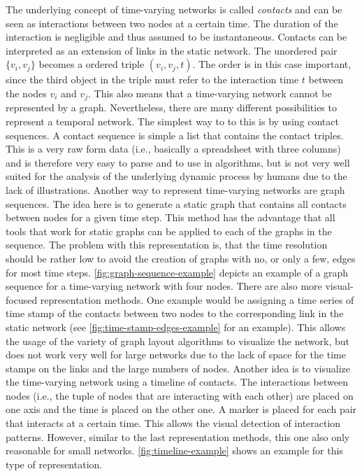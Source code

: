 The underlying concept of time-varying networks is called \emph{contacts} and can be seen as interactions between two nodes at a certain time.
The duration of the interaction is negligible and thus assumed to be instantaneous.
Contacts can be interpreted as an extension of links in the static network.
The unordered pair \(\{v_{i}, v_{j}\}\) becomes a ordered triple \((v_{i}, v_{j}, t)\).
The order is in this case important, since the third object in the triple must refer to the interaction time \(t\) between the nodes \(v_{i}\) and \(v_{j}\).
This also means that a time-varying network cannot be represented by a graph.
Nevertheless, there are many different possibilities to represent a temporal network.
The simplest way to to this is by using contact sequences.
A contact sequence is simple a list that contains the contact triples.
This is a very raw form data (i.e., basically a spreadsheet with three columns) and is therefore very easy to parse and to use in algorithms, but is not very well suited for the analysis of the underlying dynamic process by humans due to the lack of illustrations.
Another way to represent time-varying networks are graph sequences.
The idea here is to generate a static graph that contains all contacts between nodes for a given time step.
This method has the advantage that all tools that work for static graphs can be applied to each of the graphs in the sequence.
The problem with this representation is, that the time resolution should be rather low to avoid the creation of graphs with no, or only a few, edges for most time steps.
\autoref{fig:graph-sequence-example} depicts an example of a graph sequence for a time-varying network with four nodes.
There are also more visual-focused representation methods.
One example would be assigning a time series of time stamp of the contacts between two nodes to the corresponding link in the static network (see \autoref{fig:time-stamp-edges-example} for an example).
This allows the usage of the variety of graph layout algorithms to visualize the network, but does not work very well for large networks due to the lack of space for the time stamps on the links and the large numbers of nodes.
Another idea is to visualize the time-varying network using a timeline of contacts.
The interactions between nodes (i.e., the tuple of nodes that are interacting with each other) are placed on one axis and the time is placed on the other one.
A marker is placed for each pair that interacts at a certain time.
This allows the visual detection of interaction patterns.
However, similar to the last representation methods, this one also only reasonable for small networks.
\autoref{fig:timeline-example} shows an example for this type of representation.


